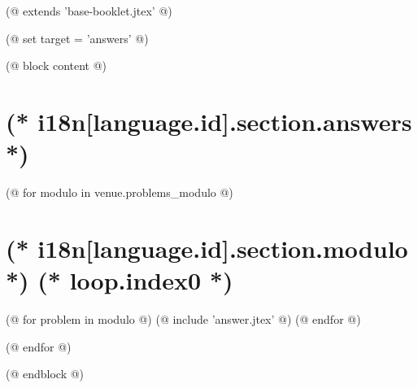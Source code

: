 (@ extends 'base-booklet.jtex' @)

(@ set target = 'answers' @)

(@ block content @)
    \thispagestyle{first}
    \afterpage{\globaldefs=1\restoregeometry}

    \vspace*{19mm}

    \section{(* i18n[language.id].section.answers *)}
    \pagestyle{answers}

    (@ for modulo in venue.problems_modulo @)
        \newpage
        \section{(* i18n[language.id].section.modulo *) (* loop.index0 *)}
        (@ for problem in modulo @)
            (@ include 'answer.jtex' @)
        (@ endfor @)

    (@ endfor @)

(@ endblock @)

